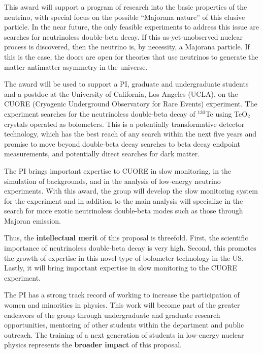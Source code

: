 %
%
This award will support a program of research into the basic properties of the neutrino, with special focus on the possible ``Majorana nature'' of this elusive particle. In the near future, the only feasible experiments to address this issue are searches for neutrinoless double-beta decay. If this as-yet-unobserved nuclear process is discovered,  then the neutrino is, by necessity, a Majorana particle.  If this is the case, the doors are open for theories that use neutrinos to generate the matter-antimatter asymmetry in the universe.
 
The award will be used to support a PI, graduate and undergraduate students and a postdoc at the University of California, Los Angeles (UCLA), on the CUORE (Cryogenic Underground Observatory for Rare Events) experiment. The experiment searches for the neutrinoless double-beta decay of $^{130}$Te using TeO$_2$ crystals operated as bolometers. This is a potentially transformative detector technology, which has the best reach of any search within the next five years and promise to move beyond double-beta decay searches to beta decay endpoint measurements, and potentially direct searches for dark matter.
 
The PI brings important expertise to CUORE in slow monitoring, in the simulation of backgrounds, and in the analysis of low-energy neutrino experiments. With this award, the group will develop the slow monitoring system for the experiment and in addition to the main analysis will specialize in the search for more exotic neutrinoless double-beta modes such as those through Majoran emission.
 
Thus, the {\bf intellectual merit} of this proposal is threefold.  First, the scientific importance of neutrinoless double-beta decay is very high.  Second, this promotes the growth of expertise in this novel type of bolometer technology in the US.  Lastly, it will bring important expertise in slow monitoring to the CUORE experiment.
 
The PI has a strong track record of working to increase the participation of women and minorities in physics. This work will become part of the greater endeavors of the group through undergraduate and graduate research opportunities, mentoring of other students within the department and public outreach. The training of a next generation of students in low-energy nuclear physics represents the {\bf broader impact} of this proposal.
 